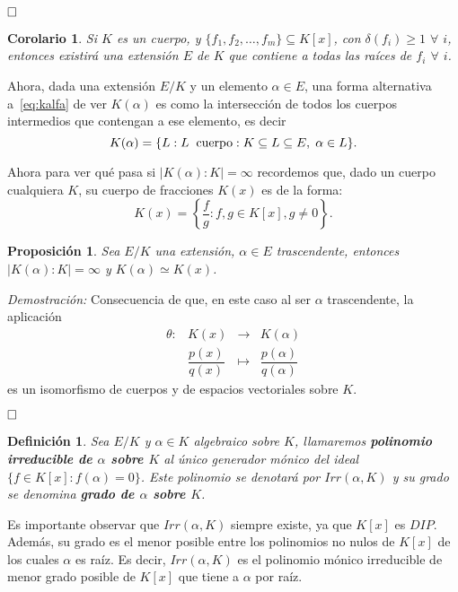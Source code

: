 \documentclass[12pt]{article}
\newtheorem{proposition}[theorem]{Proposición}
\newtheorem{definition}[theorem]{Definición}
\newtheorem{corolario}{Corolario}[theorem]
\begin{document}
$\hfill \square$

\begin{corolario} \label{eq:preclau} Si $K$ es un cuerpo, y $\lbrace f_{1}, f_{2}, \ldots, f_{m} \rbrace \subseteq K[x]$, con $\delta (f_{i}) \geq 1$ $\forall$ $i$, entonces existirá una extensión $E$ de $K$ que contiene a todas las raíces de $f_{i}$ $\forall$ $i$.
\end{corolario}

Ahora, dada una extensión $E/K$ y un  elemento $\alpha \in E$, una forma alternativa a~\ref{eq:kalfa} de ver $K(\alpha)$ es como la intersección de todos los cuerpos intermedios que contengan a ese elemento, es decir $$K(\alpha) = \lbrace L: L \hspace{0.2cm} \text{cuerpo}: K \subseteq L \subseteq E,\hspace{0.1cm} \alpha \in L\rbrace.$$

Ahora para ver qué pasa si $|K(\alpha) : K| = \infty$ recordemos que, dado un cuerpo cualquiera $K$, su cuerpo de fracciones $K(x)$ es de la forma: $$K(x) = \left\lbrace \dfrac{f}{g} : f,g \in K[x], g\neq 0 \right\rbrace.$$

\begin{proposition} Sea $E/K$ una extensión, $\alpha \in E$ trascendente, entonces $|K(\alpha): K| = \infty$ y $K(\alpha) \simeq K(x)$.
\end{proposition}
\emph{Demostración: } Consecuencia de que, en este caso al ser $\alpha$ trascendente, la aplicación $$\begin{array}{rccl}
\theta \colon &K(x)&\longrightarrow &K(\alpha) \\
&\dfrac{p(x)}{q(x)}& \longmapsto &\dfrac{p(\alpha)}{q(\alpha)}
\end{array}
$$ es un isomorfismo de cuerpos y de espacios vectoriales sobre $K$.

$\hfill \square$

\begin{definition} Sea $E/K$ y $\alpha \in K$ algebraico sobre $K$, llamaremos \textbf{polinomio irreducible de $\alpha$ sobre $K$} al único generador mónico del ideal $\lbrace f \in K[x]: f(\alpha) = 0 \rbrace$. Este polinomio se denotará por $Irr(\alpha, K)$ y su grado se denomina \textbf{grado de $\alpha$ sobre $K$}.
\end{definition}

Es importante observar que $Irr(\alpha, K)$ siempre existe, ya que $K[x]$ es $DIP$. Además, su grado es el menor posible entre los polinomios no nulos de $K[x]$ de los cuales $\alpha$ es raíz. Es decir, $Irr(\alpha, K)$ es el polinomio mónico irreducible de menor grado posible de $K[x]$ que tiene a $\alpha$ por raíz.
\end{document}
